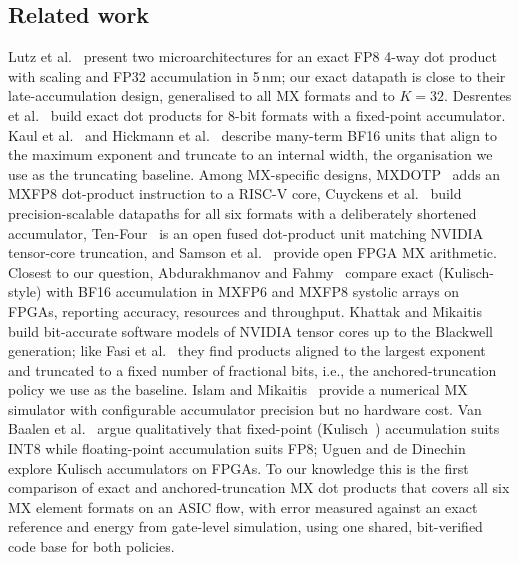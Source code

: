 \documentclass[conference,compsoc]{IEEEtran}
\begin{document}
\subsection{Related work}
Lutz et al.~\cite{lutz2024fp8} present two microarchitectures for an exact
FP8 4-way dot product with scaling and FP32 accumulation in 5\,nm; our exact
datapath is close to their late-accumulation design, generalised to all MX
formats and to $K=32$.  Desrentes et al.~\cite{desrentes2023exact} build
exact dot products for 8-bit formats with a fixed-point accumulator.
Kaul et al.~\cite{kaul2019dot} and Hickmann et al.~\cite{hickmann2020nnpt}
describe many-term BF16 units that align to the maximum exponent and truncate
to an internal width, the organisation we use as the truncating baseline.
Among MX-specific designs, MXDOTP~\cite{islamoglu2025mxdotp} adds an MXFP8
dot-product instruction to a RISC-V core, Cuyckens et
al.~\cite{cuyckens2025mx} build precision-scalable datapaths for all six
formats with a deliberately shortened accumulator, Ten-Four~\cite{rout2025tenfour}
is an open fused dot-product unit matching NVIDIA tensor-core truncation, and
Samson et al.~\cite{samson2024fpga} provide open FPGA MX arithmetic.
Closest to our question, Abdurakhmanov and Fahmy~\cite{abdurakhmanov2025mxfpga}
compare exact (Kulisch-style) with BF16 accumulation in MXFP6 and MXFP8
systolic arrays on FPGAs, reporting accuracy, resources and throughput.
Khattak and Mikaitis~\cite{khattak2025tensor} build bit-accurate software
models of NVIDIA tensor cores up to the Blackwell generation; like Fasi et
al.~\cite{fasi2021tensor} they find products aligned to the largest
exponent and truncated to a fixed number of fractional bits, i.e., the
anchored-truncation policy we use as the baseline.
Islam and Mikaitis~\cite{islam2026mxsim} provide a numerical MX simulator
with configurable accumulator precision but no hardware cost.  Van
Baalen et al.~\cite{vanbaalen2023fp8} argue qualitatively that fixed-point
(Kulisch~\cite{kulisch}) accumulation suits INT8 while floating-point
accumulation suits FP8; Uguen and de Dinechin~\cite{uguen2017kulisch}
explore Kulisch accumulators on FPGAs.  To our knowledge this is the first
comparison of exact and anchored-truncation MX dot products that covers all
six MX element formats on an ASIC flow, with error measured against an exact
reference and energy from gate-level simulation, using one shared,
bit-verified code base for both policies.
\end{document}
